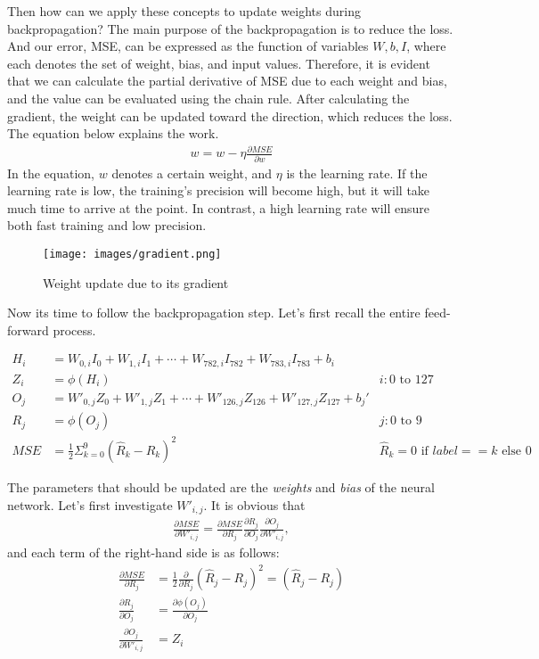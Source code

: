 \documentclass{oblivoir}
\begin{document}
Then how can we apply these concepts to update weights during backpropagation? The main purpose of the backpropagation is to reduce the loss. And our error, MSE, can be expressed as the function of variables $W, b, I$, where each denotes the set of weight, bias, and input values. Therefore, it is evident that we can calculate the partial derivative of MSE due to each weight and bias, and the value can be evaluated using the chain rule. After calculating the gradient, the weight can be updated toward the direction, which reduces the loss. The equation below explains the work.
\begin{align*}
    w = w - \eta \frac{\partial MSE}{\partial w}
\end{align*}
In the equation, $w$ denotes a certain weight, and $\eta$ is the learning rate. If the learning rate is low, the training's precision will become high, but it will take much time to arrive at the point. In contrast, a high learning rate will ensure both fast training and low precision. 

\begin{figure}[h]
    \centering
    \texttt{[image: images/gradient.png]}
    \caption*{Weight update due to its gradient}
\end{figure}

Now its time to follow the backpropagation step. Let's first recall the entire feed-forward process. 

\begin{align*}
     H_i &= W_{0, i}I_0 + W_{1, i}I_1 + \cdots + W_{782, i}I_{782} + W_{783, i}I_{783} + b_i & \\
     Z_i &= \phi(H_i) & i: 0 \text{ to } 127 \\
     O_j &= W'_{0, j}Z_0 + W'_{1, j}Z_1 + \cdots + W'_{126, j}Z_{126} + W'_{127, j}Z_{127} + b_j' & \\
     R_j &= \phi(O_j) & j: 0 \text{ to } 9 \\
     MSE &= \frac{1}{2}\Sigma_{k=0}^{9}(\hat{R}_k - R_k)^2 &
    \hat{R}_k = 0 \text{ if } label == k \text{ else } 0
\end{align*}

The parameters that should be updated are the \textit{weights} and \textit{bias} of the neural network. Let's first investigate $W'_{i,j}$. It is obvious that 
\begin{align*}
    \frac{\partial MSE}{\partial W'_{i,j}} = \frac{\partial MSE}{\partial R_j} \frac{\partial R_j}{\partial O_j} \frac{\partial O_j}{\partial W'_{i, j}},
\end{align*}
and each term of the right-hand side is as follows:
\begin{align*}
    \frac{\partial MSE}{\partial R_j} &= \frac{1}{2} \frac{\partial }{\partial R_j} (\hat{R}_j - R_j)^2  =(\hat{R}_j - R_j) \\
    \frac{\partial R_j}{\partial O_j} &= \frac{\partial\phi(O_j)}{\partial O_j} \\
    \frac{\partial O_j}{\partial W'_{i, j}} &= Z_i
\end{align*}
\end{document}
